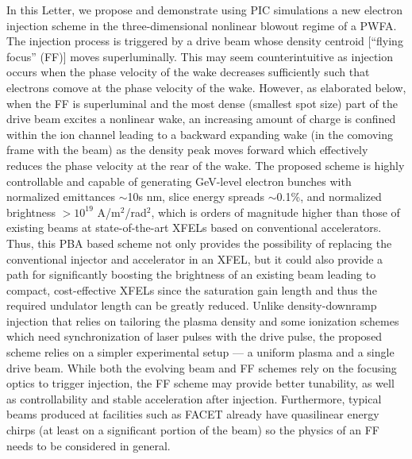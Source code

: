 \documentclass[
aps,
prl,
reprint,
superscriptaddress,
amsmath,
amssymb,
showpacs
]{revtex4-2}
\newcommand{\Bunit}{A/m$^2$/rad$^2$}
\begin{document}
In this Letter, we propose and demonstrate using PIC simulations a new electron injection scheme in the three-dimensional nonlinear blowout regime \cite{Rosenzweig1991,Pukhov2002,Lu2006a,Lu2006b} of a PWFA. The injection process is triggered by a drive beam whose density centroid [``flying focus'' (FF)] moves superluminally. This may seem counterintuitive as injection occurs when the phase velocity of the wake decreases sufficiently such that electrons comove at the phase velocity of the wake. However, as elaborated below, when the FF is superluminal and the most dense (smallest spot size) part of the drive beam excites a nonlinear wake, an increasing amount of charge is confined within the ion channel leading to a backward expanding wake (in the comoving frame with the beam) as the density peak moves forward which effectively reduces the phase velocity at the rear of the wake. The proposed scheme is highly controllable and capable of generating GeV-level electron bunches with normalized emittances $\sim$10s nm, slice energy spreads $\sim$0.1\%, and normalized brightness $>10^{19}$ \Bunit, which is orders of magnitude higher than those of existing beams at state-of-the-art XFELs based on conventional accelerators.
Thus, this PBA based scheme not only provides the possibility of replacing the conventional injector and accelerator in an XFEL, but it could also provide a path for significantly boosting the brightness of an existing beam leading to compact, cost-effective XFELs since the saturation gain length and thus the required undulator length can be greatly reduced.
Unlike density-downramp injection that relies on tailoring the plasma density and some ionization schemes which need synchronization of laser pulses with the drive pulse, the proposed scheme relies on a simpler experimental setup --- a uniform plasma and a single drive beam. While both the evolving beam \cite{Dalichaouch2020} and FF schemes rely on the focusing optics to trigger injection, the FF scheme may provide better tunability, as well as controllability and stable acceleration after injection. Furthermore, typical beams produced at facilities such as FACET already have quasilinear energy chirps (at least on a significant portion of the beam) so the physics of an FF needs to be considered in general. 
\end{document}
